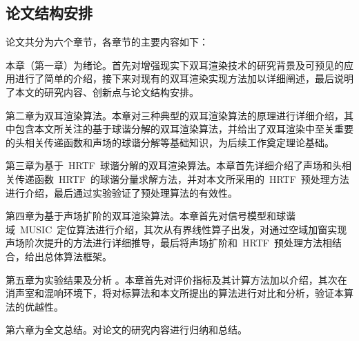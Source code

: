 \subsection{论文结构安排}

论文共分为六个章节，各章节的主要内容如下：
\newpage

\par
本章（第一章）为绪论。首先对增强现实下双耳渲染技术的研究背景及可预见的应用进行了简单的介绍，接下来对现有的双耳渲染实现方法加以详细阐述，最后说明了本文的研究内容、创新点与论文结构安排。
\par
第二章为双耳渲染算法。本章对三种典型的双耳渲染算法的原理进行详细介绍，其中包含本文所关注的基于球谐分解的双耳渲染算法，并给出了双耳渲染中至关重要的头相关传递函数和声场的球谐分解等基础知识，为后续工作奠定理论基础。
\par
第三章为基于~HRTF~球谐分解的双耳渲染算法。本章首先详细介绍了声场和头相关传递函数~HRTF~的球谐分量求解方法，并对本文所采用的~HRTF~预处理方法进行介绍，最后通过实验验证了预处理算法的有效性。
\par
第四章为基于声场扩阶的双耳渲染算法。本章首先对信号模型和球谐域~MUSIC~定位算法进行介绍，其次从有界线性算子出发，对通过空域加窗实现声场阶次提升的方法进行详细推导，最后将声场扩阶和~HRTF~预处理方法相结合，给出总体算法框架。
\par
第五章为实验结果及分析 。本章首先对评价指标及其计算方法加以介绍，其次在消声室和混响环境下，将对标算法和本文所提出的算法进行对比和分析，验证本算法的优越性。
\par
第六章为全文总结。对论文的研究内容进行归纳和总结。

